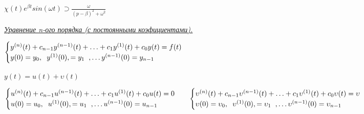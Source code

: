 \begin{Large}

\vspace{0.5cm}
$
\chi (t)e^{\beta t} sin(\omega t) 
\supset
\frac{\omega}{(p-\beta)^2 + \omega^2}
$


\end{Large}

\vspace{0.5cm}
\begin{LARGE}
\textit{\underline{Уравнение n-ого порядка (с постоянными коэфициентами).}}
\end{LARGE}

\vspace{0.5cm}
\begin{Large}
$
\begin{cases}
	y^{(n)}(t) + c_{n-1}y^{(n-1)}(t)+\ldots + c_1y^{(1)}(t) +c_0y(t) = f(t) \\
	y(0) = y_0, \text{\hspace{0.2cm}} y^{(1)}(0), = y_1 \text{\hspace{0.2cm}}, \ldots y^{(n-1)}(0) = y_{n-1}
\end{cases}
$


\vspace{0.5cm}
\begin{center}
$
y(t) = u(t) + \upsilon(t)
$
\end{center}


\end{Large}

\begin{normalsize}
$\\
\begin{matrix}
	\begin{cases}
		u^{(n)}(t) + c_{n-1}u^{(n-1)}(t)+\ldots + c_1u^{(1)}(t) +c_0u(t) = 0 \\
		u(0) = u_0, \text{\hspace{0.2cm}} u^{(1)}(0), = u_1 \text{\hspace{0.2cm}}, \ldots 			u^{(n-1)}(0) = u_{n-1}
	\end{cases}
	&
	\begin{cases}
		\upsilon^{(n)}(t) + c_{n-1}\upsilon^{(n-1)}(t)+\ldots + c_1\upsilon^{(1)}(t) +c_0\upsilon (t) = \upsilon \\
		\upsilon(0) = \upsilon_0, \text{\hspace{0.2cm}} \upsilon^{(1)}(0), = \upsilon_1 \text{\hspace{0.2cm}}, \ldots 			\upsilon^{(n-1)}(0) = \upsilon_{n-1}
	\end{cases}
\end{matrix}
$

\end{normalsize}

